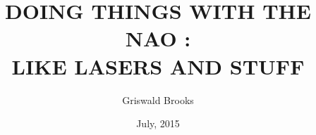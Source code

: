 

% 



\graphicspath{{./pictures/}}


\renewcommand{\baselinestretch}{1.6}
\newtheorem{theorem}{Theorem}[chapter]
\newcommand{\btheorem}{\begin{theorem}\rm}
\newcommand{\etheorem}{$\diamond$\end{theorem}}
\newtheorem{definition}{Definition}[chapter]
\newcommand{\bdefn}{\begin{definition}\rm}
\newcommand{\edefn}{\end{definition}}
\newtheorem{lemma}{Lemma}[chapter]
\newtheorem{remark}{Remark}[chapter]
\newcommand{\bremark}{\begin{remark}\rm}
\newcommand{\eremark}{\end{remark}}
\newtheorem{example}{Example}[chapter]
\newcommand{\bexample}{\begin{example}\rm}
\newcommand{\eexample}{\end{example}}
\newtheorem{assumption}{Assumption}[chapter]
\newcommand{\bassump}{\begin{assumption}\rm}
\newcommand{\eassump}{\end{assumption}}


\title{DOING THINGS WITH THE NAO :\\LIKE LASERS AND STUFF}
\author{Griswald Brooks}
\date{July, 2015}

\mstitlepage
\topmargin=0.4in
\textwidth=6.0in
\textheight=9.0in




